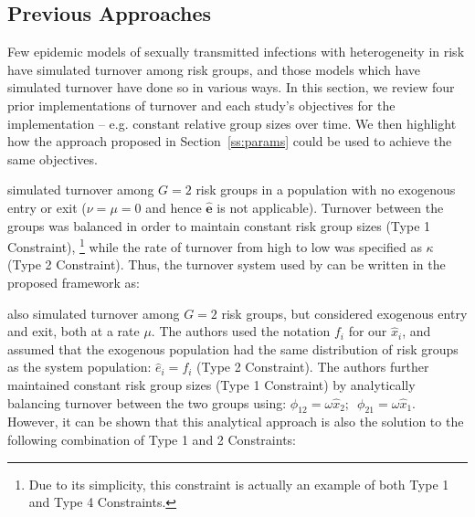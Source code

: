 \subsection{Previous Approaches}
\label{ss:prev-approach}
Few epidemic models of sexually transmitted infections
with heterogeneity in risk
have simulated turnover among risk groups,
and those models which have simulated turnover
have done so in various ways.
In this section, we review
four prior implementations of turnover and each study's objectives for the implementation
-- e.g. constant relative group sizes over time.
We then highlight how the approach proposed in Section~\ref{ss:params}
could be used to achieve the same objectives.
\par
\citet{Stigum1994} simulated turnover among $G = 2$ risk groups
in a population with no exogenous entry or exit
($\nu = \mu = 0$ and hence $\bm{\hat{e}}$ is not applicable).
Turnover between the groups was balanced
in order to maintain constant risk group sizes (Type 1 Constraint),%
\footnote{Due to its simplicity,
  this constraint is actually an example of both Type 1 and Type 4 Constraints.}
while the rate of turnover from high to low
was specified as $\kappa$ (Type 2 Constraint).
Thus, the turnover system used by \citet{Stigum1994} can be written
in the proposed framework as:

\par
\citet{Henry2015} also simulated turnover among $G = 2$ risk groups,
but considered exogenous entry and exit, both at a rate $\mu$.
The authors used the notation $f_i$ for our $\hat{x}_i$, and assumed that
the exogenous population had the same distribution of risk groups
as the system population: $\hat{e}_i = f_i$ (Type 2 Constraint).
The authors further maintained constant risk group sizes (Type 1 Constraint)
by analytically balancing turnover between the two groups using:
$\phi_{12} = \omega \hat{x}_2 ;\enspace \phi_{21} = \omega \hat{x}_1$.
However, it can be shown that this analytical approach
is also the solution to the following combination of Type 1 and 2 Constraints:

